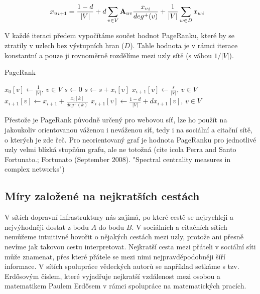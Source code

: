 \documentclass[12pt,titlepage]{report}
\begin{document}
\begin{align}
{x_u}_{i + 1} &= \frac{1 - d}{|V|} + d \displaystyle\sum_{v \in V} {\bf A}_{uv} \frac{{x_v}_i}{deg^+ (v)} + \frac{1}{|V|} \displaystyle\sum_{w \in D} {x_w}_i
\end{align}

V každé iteraci předem vypočítáme součet hodnot PageRanku, které by se ztratily
v uzlech bez výstupních hran ($D$). Tahle hodnota je v rámci iterace konstantní
a pouze ji rovnoměrně rozdělíme mezi uzly sítě (s váhou $1/|V|$).

\begin{center}
\begin{minipage}{\textwidth}
\begin{algorithm}[H]
	\caption{PageRank}
		\label{alg:pagerank}

	\begin{algorithmic}[1]
	\Statex
	\State $x_0[v] \gets \frac{1}{|V|}$, $v \in V$
		\State $s \gets 0$
				\State $s \gets s + x_{i}[v]$
			\EndIf
		\EndFor
		\State $x_{i + 1}[v] \gets \frac{s}{|V|}$, $v \in V$
				\State $x_{i + 1}[v] \gets x_{i + 1} + \frac{x_i[k]}{deg^+(k)}$
			\EndFor
		\EndFor
		\State $x_{i + 1}[v] \gets \frac{1 - d}{|V|} + d x_{i + 1}[v]$, $v \in V$
	\EndFor
	\end{algorithmic}
\end{algorithm}
\end{minipage}
\end{center}
\mbox{}

Přestože je PageRank původně určený pro webovou síť, lze ho použít na
jakoukoliv orientovanou váženou i neváženou síť, tedy i na sociální a citační
sítě, o kterých je zde řeč. Pro neorientovaný graf je hodnota PageRanku pro
jednotlivé uzly velmi blízká stupňům grafu, ale ne totožná (cite icola Perra
and Santo Fortunato.; Fortunato (September 2008). "Spectral centrality measures
in complex networks")

\subsection{Míry založené na nejkratších cestách}
V sítích dopravní infrastruktury nás zajímá, po které cestě se nejrychleji a
nejvýhodněji dostat z bodu $A$ do bodu $B$. V sociálních a citačních sítích
nemůžeme intuitivně hovořit o nějakých cestách mezi uzly, protože ani přesně
nevíme jak takovou cestu interpretovat. Nejkratší cesta mezi přáteli v sociální
síti může znamenat, přes které přátele se mezi nimi nejpravděpodobněji šíří
informace. V sítích spolupráce vědeckých autorů se například setkáme s tzv.
Erdősovým číslem, které vyjadřuje nejkratší vzdálenost mezi osobou a
matematikem Paulem Erdősem v rámci spolupráce na matematických pracích.
\end{document}
